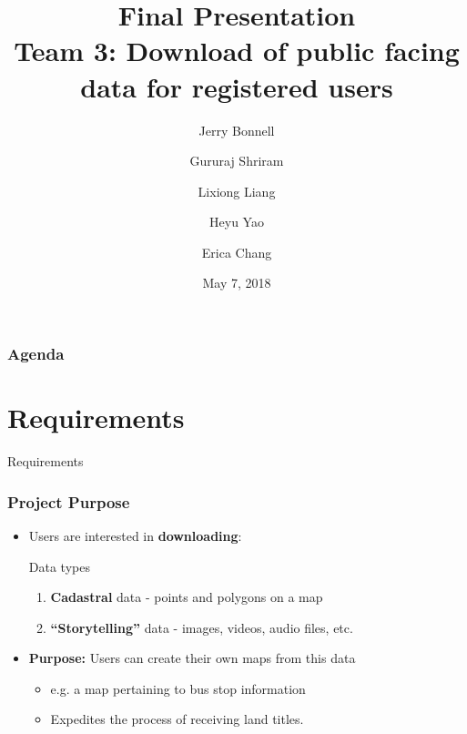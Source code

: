 \documentclass[xcolor=table]{beamer}
\title{
\textbf{Final Presentation} \\ \small{Team 3: Download of public facing data for registered users}
}
\author{
Jerry Bonnell
\and Gururaj Shriram
\and Lixiong Liang
\and Heyu Yao
\and Erica Chang 
} %
\date{May 7, 2018} %
\begin{document}
\begin{frame}[plain]
	\titlepage
\end{frame}

\begin{frame}
	\frametitle{Agenda}
	\tableofcontents
\end{frame}

\section{Requirements}
\begin{frame}[plain]
	\Huge{\centerline{Requirements}}
\end{frame}

\begin{frame}
	\frametitle{Project Purpose}
	\begin{itemize}
		\item Users are interested in \textbf{downloading}:
		      \begin{block}{Data types}
			      \begin{enumerate}
					  \item \textbf{Cadastral} data - points and polygons on a map
					  \item \textbf{``Storytelling''} data - images, videos, audio files, etc. %
			      \end{enumerate}
			  \end{block}
        \vspace{4px}
		\item \textbf{Purpose:} Users can create their own maps from this data
			\begin{itemize}
				\item e.g. a map pertaining to bus stop information
				\item Expedites the process of receiving land titles.
			\end{itemize}
	\end{itemize}
\end{frame}
\end{document}
